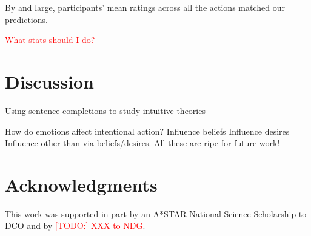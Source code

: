 \documentclass[10pt,letterpaper]{article}
\newcommand{\red}[1]{\textcolor{Red}{#1}}
\begin{document}
By and large, participants' mean ratings across all the actions matched our predictions.

\red{What stats should I do?}



\section{Discussion}

Using sentence completions to study intuitive theories

How do emotions affect intentional action?
Influence beliefs
Influence desires
Influence other than via beliefs/desires.
All these are ripe for future work!


\section{Acknowledgments}

This work was supported in part by an A*STAR National Science Scholarship to DCO and by \red{[TODO:] XXX to NDG}.




\setlength{\bibleftmargin}{.125in}
\setlength{\bibindent}{-\bibleftmargin}


\end{document}
